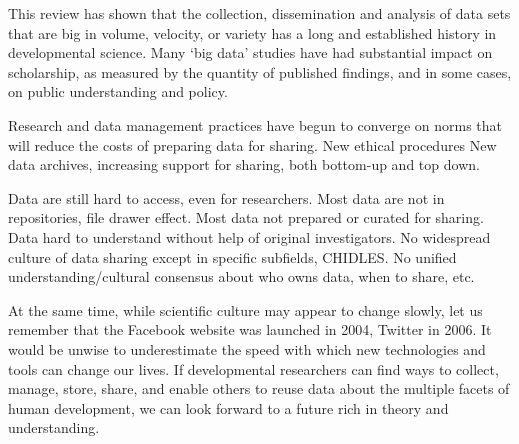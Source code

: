 \documentclass[letterpaper,man,apacite]{apa6}
\begin{document}
This review has shown that the collection, dissemination and analysis of data sets that are big in volume, velocity, or variety has a long and established history in developmental science.
Many `big data' studies have had substantial impact on scholarship, as measured by the quantity of published findings, and in some cases, on public understanding and policy.

Research and data management practices have begun to converge on norms that will reduce the costs of preparing data for sharing.
New ethical procedures
New data archives, increasing support for sharing, both bottom-up and top down.

Data are still hard to access, even for researchers.
Most data are not in repositories, file drawer effect.
Most data not prepared or curated for sharing.
Data hard to understand without help of original investigators.
No widespread culture of data sharing except in specific subfields, CHIDLES.
No unified understanding/cultural consensus about who owns data, when to share, etc.

At the same time, while scientific culture may appear to change slowly, let us remember that the Facebook website was launched in 2004, Twitter in 2006.
It would be unwise to underestimate the speed with which new technologies and tools can change our lives.
If developmental researchers can find ways to collect, manage, store, share, and enable others to reuse data about the multiple facets of human development, we can look forward to a future rich in theory and understanding.


\end{document}
